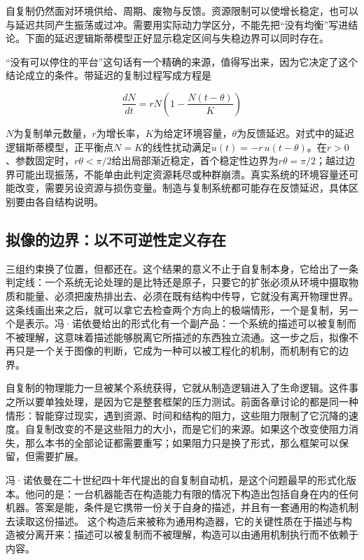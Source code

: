 自复制仍然面对环境供给、周期、废物与反馈。资源限制可以使增长稳定，也可以与延迟共同产生振荡或过冲。需要用实际动力学区分，不能先把“没有均衡”写进结论。下面的延迟逻辑斯蒂模型正好显示稳定区间与失稳边界可以同时存在。

“没有可以停住的平台”这句话有一个精确的来源，值得写出来，因为它决定了这个结论成立的条件。带延迟的复制过程写成方程是

\begin{equation}
\frac{dN}{dt}=rN\left(1-\frac{N(t-\theta)}{K}\right)
\end{equation}

$N$为复制单元数量，$r$为增长率，$K$为给定环境容量，$\theta$为反馈延迟。对式中的延迟逻辑斯蒂模型，正平衡点$N=K$的线性扰动满足$\dot u(t)=-r\,u(t-\theta)$。在$r>0$、参数固定时，$r\theta<\pi/2$给出局部渐近稳定，首个稳定性边界为$r\theta=\pi/2$；越过边界可能出现振荡，不能单由此判定资源耗尽或种群崩溃。真实系统的环境容量还可能改变，需要另设资源与损伤变量。制造与复制系统都可能存在反馈延迟，具体区别要由各自结构说明。

\subsection{拟像的边界：以不可逆性定义存在}

三组约束换了位置，但都还在。这个结果的意义不止于自复制本身，它给出了一条判定线：一个系统无论处理的是比特还是原子，只要它的扩张必须从环境中摄取物质和能量、必须把废热排出去、必须在既有结构中传导，它就没有离开物理世界。这条线画出来之后，就可以拿它去检查两个方向上的极端情形，一个是复制，另一个是表示。冯·诺依曼给出的形式化有一个副产品：一个系统的描述可以被复制而不被理解，这意味着描述能够脱离它所描述的东西独立流通。这一步之后，拟像不再只是一个关于图像的判断，它成为一种可以被工程化的机制，而机制有它的边界。


自复制的物理能力一旦被某个系统获得，它就从制造逻辑进入了生命逻辑。这件事之所以要单独处理，是因为它是整套框架的压力测试。前面各章讨论的都是同一种情形：智能穿过现实，遇到资源、时间和结构的阻力，这些阻力限制了它沉降的速度。自复制改变的不是这些阻力的大小，而是它们的来源。如果这个改变使阻力消失，那么本书的全部论证都需要重写；如果阻力只是换了形式，那么框架可以保留，但需要扩展。

冯·诺依曼在二十世纪四十年代提出的自复制自动机，是这个问题最早的形式化版本。他问的是：一台机器能否在构造能力有限的情况下构造出包括自身在内的任何机器。答案是能，条件是它携带一份关于自身的描述，并且有一套通用的构造机制去读取这份描述。\cite{vonneumann1966theory} 这个构造后来被称为通用构造器，它的关键性质在于描述与构造被分离开来：描述可以被复制而不被理解，构造可以由通用机制执行而不依赖于内容。

